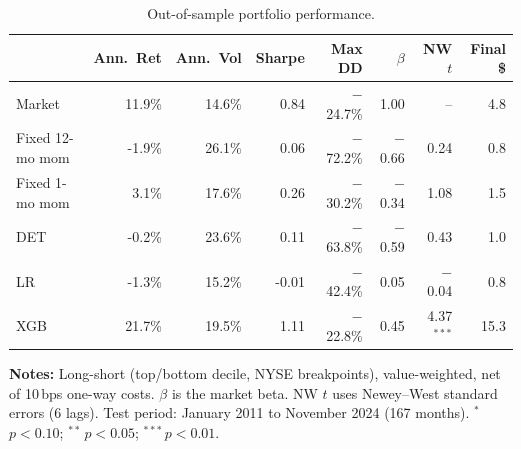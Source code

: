 \begin{table}[htbp]
\centering
\small
\begin{tabular}{l r r r r r r r}
\toprule
 & Ann.\ Ret & Ann.\ Vol & Sharpe & Max DD & $\beta$ & NW $t$ & Final \$ \\
\midrule
Market & 11.9\% & 14.6\% & 0.84 & $-$24.7\% & 1.00 & -- & 4.8 \\
\midrule
Fixed 12-mo mom & -1.9\% & 26.1\% & 0.06 & $-$72.2\% & $-$0.66 & 0.24 & 0.8 \\
Fixed 1-mo mom & 3.1\% & 17.6\% & 0.26 & $-$30.2\% & $-$0.34 & 1.08 & 1.5 \\
DET & -0.2\% & 23.6\% & 0.11 & $-$63.8\% & $-$0.59 & 0.43 & 1.0 \\
LR & -1.3\% & 15.2\% & -0.01 & $-$42.4\% & 0.05 & $-$0.04 & 0.8 \\
XGB & 21.7\% & 19.5\% & 1.11 & $-$22.8\% & 0.45 & 4.37$^{***}$ & 15.3 \\
\bottomrule
\end{tabular}
\caption{Out-of-sample portfolio performance.}
\label{tab:performance}

\medskip
\small
\textbf{Notes:} Long-short (top/bottom decile, NYSE breakpoints), value-weighted, net of 10\,bps one-way costs. $\beta$ is the market beta. NW $t$ uses Newey--West standard errors (6 lags). Test period: January 2011 to November 2024 (167 months). $^{*}$\,$p<0.10$; $^{**}$\,$p<0.05$; $^{***}$\,$p<0.01$.
\end{table}
